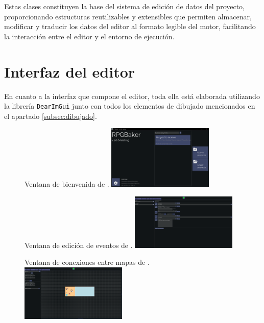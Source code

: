 Estas clases constituyen la base del sistema de edición de datos del proyecto, proporcionando estructuras reutilizables y extensibles que permiten almacenar, modificar y traducir los datos del editor al formato legible del motor, facilitando la interacción entre el editor y el entorno de ejecución.

\section{Interfaz del editor}
En cuanto a la interfaz que compone el editor, toda ella está elaborada utilizando la librería \texttt{DearImGui} junto con todos los elementos de dibujado mencionados en el apartado \ref{subsec:dibujado}. 

\begin{figure}[t]
	\centering
	\begin{SubFloat}
		{\label{fig:welcomewindow}%
		Ventana de bienvenida de \baker.}%
		\includegraphics[width=0.45\textwidth]{Imagenes/Vectorial/welcomewindow}%
	\end{SubFloat}
	\qquad
	\begin{SubFloat}
		{\label{fig:eventwindow}%
		Ventana de edición de eventos de \baker.}%
		\includegraphics[width=0.45\textwidth]{Imagenes/Vectorial/eventos}%
	\end{SubFloat}
	\begin{SubFloat}
		{\label{fig:conexiones}%
		Ventana de conexiones entre mapas de \baker.}%
		\includegraphics[width=0.45\textwidth]{Imagenes/Vectorial/conexiones}%

\end{SubFloat}
\end{figure}
